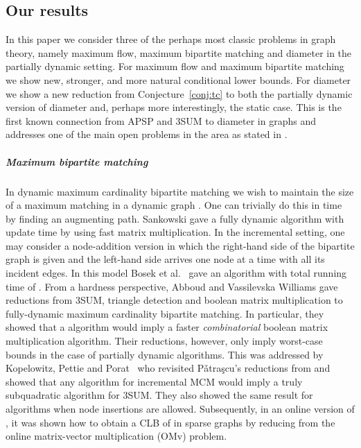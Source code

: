 \documentclass[a4paper,11pt]{article}
\theoremstyle{definition}
\begin{document}
\subsection{Our results}
In this paper we consider three of the perhaps most classic problems in graph
theory, namely maximum flow, maximum bipartite matching and diameter in the
partially dynamic setting.
For maximum flow and maximum bipartite matching we
show new, stronger, and more natural conditional lower bounds. For diameter we
show a new reduction from Conjecture~\ref{conj:tc} to both the partially
dynamic version of diameter and, perhaps more interestingly, the static case.
This is the first known connection from APSP and 3SUM to diameter in graphs and
addresses one of the main open problems in the area as stated in
\cite{AbboudGV15}.

\subparagraph*{Maximum bipartite matching}
In dynamic maximum cardinality bipartite matching we wish to maintain the size
of a maximum matching in a dynamic graph . One can trivially do this in
 time by finding an augmenting path. Sankowski \cite{Sankowski07} gave a fully
dynamic algorithm with update time  by using fast matrix
multiplication. In the incremental setting, one may consider a node-addition version in which the right-hand side of the
bipartite graph is given and the left-hand side arrives one node at a time with
all its incident edges. In this model Bosek et al.~\cite{BosekLSZ14} gave an
algorithm with total running time of . From a hardness
perspective, Abboud and Vassilevska Williams \cite{AbboudV14} gave reductions
from 3SUM, triangle detection and boolean matrix multiplication to
fully-dynamic maximum cardinality bipartite matching. In particular, they
showed that a  algorithm would imply a faster \emph{combinatorial} boolean
matrix multiplication algorithm. Their reductions, however, only imply
worst-case bounds in the case of partially dynamic algorithms. This was
addressed by Kopelowitz, Pettie and Porat~\cite{KopelowitzPP16} who revisited
P\v{a}tra\c{s}cu's reductions from \cite{Patrascu10} and showed that any
 algorithm for incremental MCM would imply a truly
subquadratic algorithm for 3SUM. They also showed the same result for
 algorithms when node insertions are allowed. Subsequently,
in an online version of \cite{HenzingerKNS15}, it was shown how to obtain a CLB
of  in sparse graphs by reducing from the online matrix-vector
multiplication (OMv) problem.
\end{document}
